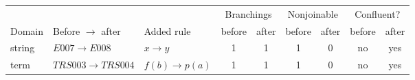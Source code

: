 \small
\setlength{\tabcolsep}{5pt}
\begin{tabular}{@{}lllcccccc@{}}
\toprule
 & & & \multicolumn{2}{c}{Branchings} & \multicolumn{2}{c}{Nonjoinable} & \multicolumn{2}{c}{Confluent?} \\
\cmidrule(lr){4-5}\cmidrule(lr){6-7}\cmidrule(lr){8-9}
Domain & Before $\to$ after & Added rule & before & after & before & after & before & after \\
\midrule
string & $E007 \to E008$ & $x \to y$ & 1 & 1 & 1 & 0 & no & yes \\
term & $TRS003 \to TRS004$ & $f(b) \to p(a)$ & 1 & 1 & 1 & 0 & no & yes \\
\bottomrule
\end{tabular}
